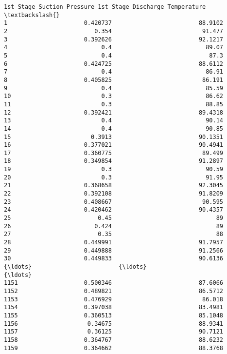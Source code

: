 \documentclass[11pt]{article}
\begin{document}
\begin{tcolorbox}[breakable, size=fbox, boxrule=.5pt, pad at break*=1mm, opacityfill=0]
\begin{Verbatim}[commandchars=\\\{\}]
     1st Stage Suction Pressure 1st Stage Discharge Temperature  \textbackslash{}
1                      0.420737                         88.9102
2                         0.354                          91.477
3                      0.392626                         92.1217
4                           0.4                           89.07
5                           0.4                            87.3
6                      0.424725                         88.6112
7                           0.4                           86.91
8                      0.405825                          86.191
9                           0.4                           85.59
10                          0.3                           86.62
11                          0.3                           88.85
12                     0.392421                         89.4318
13                          0.4                           90.14
14                          0.4                           90.85
15                       0.3913                         90.1351
16                     0.377021                         90.4941
17                     0.360775                          89.499
18                     0.349854                         91.2897
19                          0.3                           90.59
20                          0.3                           91.95
21                     0.368658                         92.3045
22                     0.392108                         91.8209
23                     0.408667                          90.595
24                     0.420462                         90.4357
25                         0.45                              89
26                        0.424                              89
27                         0.35                              88
28                     0.449991                         91.7957
29                     0.449888                         91.2566
30                     0.449833                         90.6136
{\ldots}                         {\ldots}                             {\ldots}
1151                   0.500346                         87.6066
1152                   0.489821                         86.5712
1153                   0.476929                          86.018
1154                   0.397038                         83.4981
1155                   0.360513                         85.1048
1156                    0.34675                         88.9341
1157                    0.36125                         90.7121
1158                   0.364767                         88.6232
1159                   0.364662                         88.3768

\end{Verbatim}
\end{tcolorbox}
\end{document}

